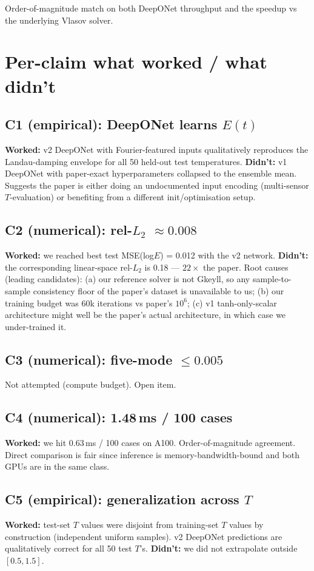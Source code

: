 \documentclass[11pt]{article}
\begin{document}
Order-of-magnitude match on both DeepONet throughput and the speedup vs the underlying
Vlasov solver.

\section{Per-claim what worked / what didn't}

\subsection*{C1 (empirical): DeepONet learns $E(t)$}
\textbf{Worked:} v2 DeepONet with Fourier-featured inputs qualitatively reproduces the
Landau-damping envelope for all 50 held-out test temperatures.
\textbf{Didn't:} v1 DeepONet with paper-exact hyperparameters collapsed to the
ensemble mean. Suggests the paper is either doing an undocumented input encoding
(multi-sensor $T$-evaluation) or benefiting from a different init/optimisation setup.

\subsection*{C2 (numerical): rel-$L_2$ $\approx 0.008$}
\textbf{Worked:} we reached best test MSE(log$E$) = 0.012 with the v2 network.
\textbf{Didn't:} the corresponding linear-space rel-$L_2$ is 0.18 — $22\times$ the paper.
Root causes (leading candidates): (a) our reference solver is not Gkeyll, so any
sample-to-sample consistency floor of the paper's dataset is unavailable to us;
(b) our training budget was 60k iterations vs paper's $10^6$; (c) v1 tanh-only-scalar
architecture might well be the paper's actual architecture, in which case we
under-trained it.

\subsection*{C3 (numerical): five-mode $\le 0.005$}
Not attempted (compute budget). Open item.

\subsection*{C4 (numerical): 1.48\,ms / 100 cases}
\textbf{Worked:} we hit 0.63\,ms / 100 cases on A100. Order-of-magnitude agreement.
Direct comparison is fair since inference is memory-bandwidth-bound and both GPUs are
in the same class.

\subsection*{C5 (empirical): generalization across $T$}
\textbf{Worked:} test-set $T$ values were disjoint from training-set $T$ values
by construction (independent uniform samples). v2 DeepONet predictions are
qualitatively correct for all 50 test $T$'s.
\textbf{Didn't:} we did not extrapolate outside $[0.5, 1.5]$.
\end{document}
